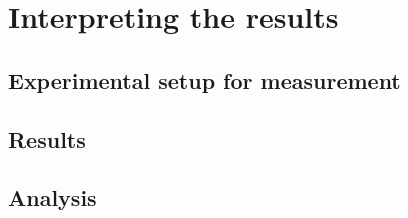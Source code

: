 \documentclass[../report.tex]{subfiles}
\begin{document}
	
\chapter{Interpreting the results}
	\section{Experimental setup for measurement}
	
	\section{Results}
	
	\section{Analysis}
	
\end{document}
